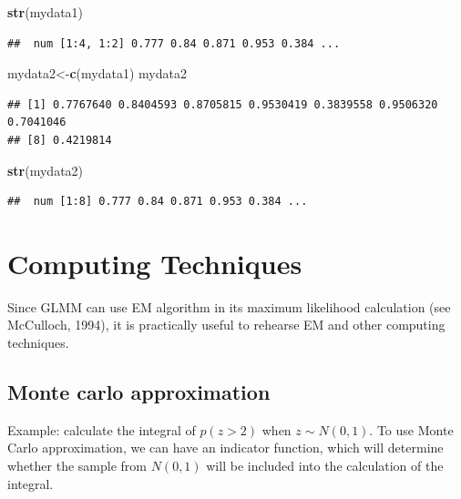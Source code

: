 \documentclass[]{book}
\newenvironment{Shaded}{\begin{snugshade}}{\end{snugshade}}
\newcommand{\KeywordTok}[1]{\textcolor[rgb]{0.13,0.29,0.53}{\textbf{#1}}}
\newcommand{\NormalTok}[1]{#1}
\begin{document}
\begin{Shaded}
\begin{Highlighting}[]
\KeywordTok{str}\NormalTok{(mydata1)}
\end{Highlighting}
\end{Shaded}

\begin{verbatim}
##  num [1:4, 1:2] 0.777 0.84 0.871 0.953 0.384 ...
\end{verbatim}

\begin{Shaded}
\begin{Highlighting}[]
\NormalTok{mydata2<-}\KeywordTok{c}\NormalTok{(mydata1)}
\NormalTok{mydata2}
\end{Highlighting}
\end{Shaded}

\begin{verbatim}
## [1] 0.7767640 0.8404593 0.8705815 0.9530419 0.3839558 0.9506320 0.7041046
## [8] 0.4219814
\end{verbatim}

\begin{Shaded}
\begin{Highlighting}[]
\KeywordTok{str}\NormalTok{(mydata2)}
\end{Highlighting}
\end{Shaded}

\begin{verbatim}
##  num [1:8] 0.777 0.84 0.871 0.953 0.384 ...
\end{verbatim}

\hypertarget{computing-techniques}{%
\chapter{Computing Techniques}\label{computing-techniques}}

Since GLMM can use EM algorithm in its maximum likelihood calculation (see McCulloch, 1994), it is practically useful to rehearse EM and other computing techniques.

\hypertarget{monte-carlo-approximation}{%
\section{Monte carlo approximation}\label{monte-carlo-approximation}}

Example: calculate the integral of \(p(z>2)\) when \(z \sim N(0,1)\). To use Monte Carlo approximation, we can have an indicator function, which will determine whether the sample from \(N(0,1)\) will be included into the calculation of the integral.
\end{document}
